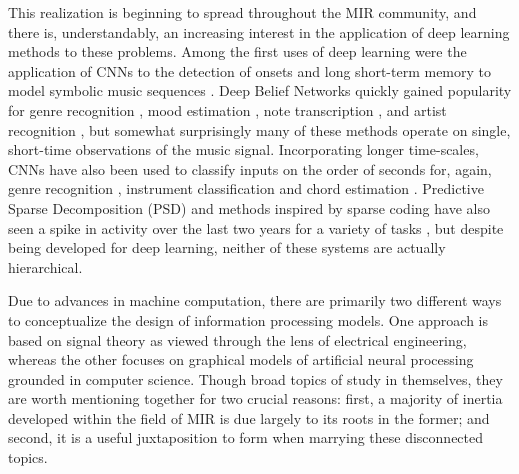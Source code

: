 This realization is beginning to spread throughout the MIR community, and there is, understandably, an increasing interest in the application of deep learning methods to these problems.
Among the first uses of deep learning were the application of CNNs to the detection of onsets \cite{Lacoste2007} and long short-term memory to model symbolic music sequences \cite{Eck2008}.
Deep Belief Networks quickly gained popularity for genre recognition \cite{Hamel2009}, mood estimation \cite{Schmidt2011}, note transcription \cite{Nam2011}, and artist recognition \cite{Dieleman2011}, but somewhat surprisingly many of these methods operate on single, short-time observations of the music signal.
Incorporating longer time-scales, CNNs have also been used to classify inputs on the order of seconds for, again, genre recognition \cite{Li2010}, instrument classification \cite{Humphrey2010} and chord estimation \cite{Humphrey2011, Humphrey2012b}.
Predictive Sparse Decomposition (PSD) and methods inspired by sparse coding have also seen a spike in activity over the last two years for a variety of tasks \cite{Henaff2011, Nam2012}, but despite being developed for deep learning, neither of these systems are actually hierarchical.


Due to advances in machine computation, there are primarily two different ways to conceptualize the design of information processing models.
One approach is based on signal theory as viewed through the lens of electrical engineering, whereas the other focuses on graphical models of artificial neural processing grounded in computer science.
Though broad topics of study in themselves, they are worth mentioning together for two crucial reasons: first, a majority of inertia developed within the field of MIR is due largely to its roots in the former; and second, it is a useful juxtaposition to form when marrying these disconnected topics.

